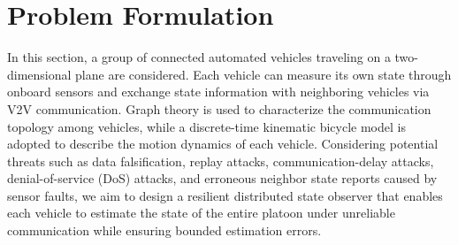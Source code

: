 \documentclass[letterpaper,journal]{IEEEtran}
\begin{document}
\section{Problem Formulation}\label{sec_vehiclemodel}

In this section, a group of connected automated vehicles traveling on a two-dimensional plane are considered. Each vehicle can measure its own state through onboard sensors and exchange state information with neighboring vehicles via V2V communication. Graph theory is used to characterize the communication topology among vehicles, while a discrete-time kinematic bicycle model is adopted to describe the motion dynamics of each vehicle. Considering potential threats such as data falsification, replay attacks, communication-delay attacks, denial-of-service (DoS) attacks, and erroneous neighbor state reports caused by sensor faults, we aim to design a resilient distributed state observer that enables each vehicle to estimate the state of the entire platoon under unreliable communication while ensuring bounded estimation errors.
\end{document}
